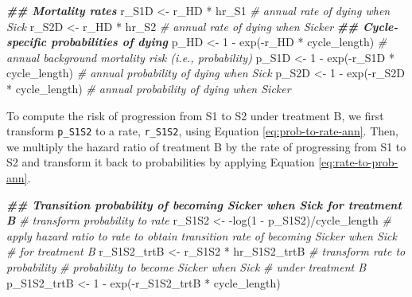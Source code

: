 \documentclass[
]{article}
\newenvironment{Shaded}{\begin{snugshade}}{\end{snugshade}}
\newcommand{\CommentTok}[1]{\textcolor[rgb]{0.56,0.35,0.01}{\textit{#1}}}
\newcommand{\DecValTok}[1]{\textcolor[rgb]{0.00,0.00,0.81}{#1}}
\newcommand{\DocumentationTok}[1]{\textcolor[rgb]{0.56,0.35,0.01}{\textbf{\textit{#1}}}}
\newcommand{\FunctionTok}[1]{\textcolor[rgb]{0.00,0.00,0.00}{#1}}
\newcommand{\NormalTok}[1]{#1}
\newcommand{\OtherTok}[1]{\textcolor[rgb]{0.56,0.35,0.01}{#1}}
\newcommand{\SpecialCharTok}[1]{\textcolor[rgb]{0.00,0.00,0.00}{#1}}
\begin{document}
\begin{Shaded}
\begin{Highlighting}[]
\DocumentationTok{\#\# Mortality rates}
\NormalTok{r\_S1D }\OtherTok{\textless{}{-}}\NormalTok{ r\_HD }\SpecialCharTok{*}\NormalTok{ hr\_S1 }\CommentTok{\# annual rate of dying when Sick}
\NormalTok{r\_S2D }\OtherTok{\textless{}{-}}\NormalTok{ r\_HD }\SpecialCharTok{*}\NormalTok{ hr\_S2 }\CommentTok{\# annual rate of dying when Sicker}
\DocumentationTok{\#\# Cycle{-}specific probabilities of dying}
\NormalTok{p\_HD  }\OtherTok{\textless{}{-}} \DecValTok{1} \SpecialCharTok{{-}} \FunctionTok{exp}\NormalTok{(}\SpecialCharTok{{-}}\NormalTok{r\_HD }\SpecialCharTok{*}\NormalTok{ cycle\_length)  }\CommentTok{\# annual background mortality risk (i.e., probability)}
\NormalTok{p\_S1D }\OtherTok{\textless{}{-}} \DecValTok{1} \SpecialCharTok{{-}} \FunctionTok{exp}\NormalTok{(}\SpecialCharTok{{-}}\NormalTok{r\_S1D }\SpecialCharTok{*}\NormalTok{ cycle\_length) }\CommentTok{\# annual probability of dying when Sick}
\NormalTok{p\_S2D }\OtherTok{\textless{}{-}} \DecValTok{1} \SpecialCharTok{{-}} \FunctionTok{exp}\NormalTok{(}\SpecialCharTok{{-}}\NormalTok{r\_S2D }\SpecialCharTok{*}\NormalTok{ cycle\_length) }\CommentTok{\# annual probability of dying when Sicker}
\end{Highlighting}
\end{Shaded}

To compute the risk of progression from S1 to S2 under treatment B, we first transform \texttt{p\_S1S2} to a rate, \texttt{r\_S1S2}, using Equation \eqref{eq:prob-to-rate-ann}. Then, we multiply the hazard ratio of treatment B by the rate of progressing from S1 to S2 and transform it back to probabilities by applying Equation \eqref{eq:rate-to-prob-ann}.

\begin{Shaded}
\begin{Highlighting}[]
\DocumentationTok{\#\# Transition probability of becoming Sicker when Sick for treatment B}
\CommentTok{\# transform probability to rate}
\NormalTok{r\_S1S2 }\OtherTok{\textless{}{-}} \SpecialCharTok{{-}}\FunctionTok{log}\NormalTok{(}\DecValTok{1} \SpecialCharTok{{-}}\NormalTok{ p\_S1S2)}\SpecialCharTok{/}\NormalTok{cycle\_length}
\CommentTok{\# apply hazard ratio to rate to obtain transition rate of becoming Sicker when Sick }
\CommentTok{\# for treatment B}
\NormalTok{r\_S1S2\_trtB }\OtherTok{\textless{}{-}}\NormalTok{ r\_S1S2 }\SpecialCharTok{*}\NormalTok{ hr\_S1S2\_trtB}
\CommentTok{\# transform rate to probability}
\CommentTok{\# probability to become Sicker when Sick }
\CommentTok{\# under treatment B}
\NormalTok{p\_S1S2\_trtB }\OtherTok{\textless{}{-}} \DecValTok{1} \SpecialCharTok{{-}} \FunctionTok{exp}\NormalTok{(}\SpecialCharTok{{-}}\NormalTok{r\_S1S2\_trtB }\SpecialCharTok{*}\NormalTok{ cycle\_length) }
\end{Highlighting}
\end{Shaded}
\end{document}

